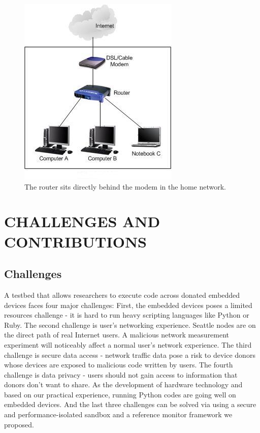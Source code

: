 \documentclass[conference]{IEEEtran}   	%
\begin{document}
\begin{figure}%
\centering
\includegraphics[width=0.5\columnwidth]{home-network.jpg}
\caption{The router sits directly behind the modem in the home network.}
\label{figure:design}
\end{figure}

\section{CHALLENGES AND CONTRIBUTIONS}
\label{sec.design}
\subsection{Challenges}
A testbed that allows researchers to execute code across donated embedded devices faces four major challenges: First, the embedded devices poses a limited resources challenge - it is hard to run heavy scripting languages like Python or Ruby. The second challenge is user's networking experience. Seattle nodes are on the direct path of real Internet users. A malicious network measurement experiment will noticeably affect a normal user's network experience. The third challenge is secure data access - network traffic data pose a risk to device donors whose devices are exposed to malicious code written by users. The fourth challenge is data privacy - users should not gain access to information that donors don't want to share. As the development of hardware technology and based on our practical experience, running Python codes are going well on embedded devices. And the last three challenges can be solved via using a secure and performance-isolated sandbox and a reference monitor framework we proposed.
\end{document}
